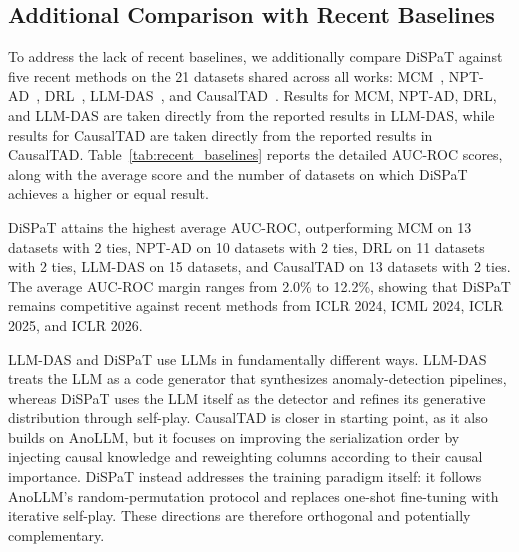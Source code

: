 \subsection{Additional Comparison with Recent Baselines}
\label{sec:app:recent_baselines}

To address the lack of recent baselines, we additionally compare DiSPaT against five recent methods on the 21 datasets shared across all works: MCM~\citep{yin2024mcm}, NPT-AD~\citep{thimonier2024nptad}, DRL~\citep{ye2025drl}, LLM-DAS~\citep{ye2026llmdas}, and CausalTAD~\citep{wang2026causaltad}. Results for MCM, NPT-AD, DRL, and LLM-DAS are taken directly from the reported results in LLM-DAS, while results for CausalTAD are taken directly from the reported results in CausalTAD. Table~\ref{tab:recent_baselines} reports the detailed AUC-ROC scores, along with the average score and the number of datasets on which DiSPaT achieves a higher or equal result.

DiSPaT attains the highest average AUC-ROC, outperforming MCM on 13 datasets with 2 ties, NPT-AD on 10 datasets with 2 ties, DRL on 11 datasets with 2 ties, LLM-DAS on 15 datasets, and CausalTAD on 13 datasets with 2 ties. The average AUC-ROC margin ranges from 2.0\% to 12.2\%, showing that DiSPaT remains competitive against recent methods from ICLR 2024, ICML 2024, ICLR 2025, and ICLR 2026.

LLM-DAS and DiSPaT use LLMs in fundamentally different ways. LLM-DAS treats the LLM as a code generator that synthesizes anomaly-detection pipelines, whereas DiSPaT uses the LLM itself as the detector and refines its generative distribution through self-play. CausalTAD is closer in starting point, as it also builds on AnoLLM, but it focuses on improving the serialization order by injecting causal knowledge and reweighting columns according to their causal importance. DiSPaT instead addresses the training paradigm itself: it follows AnoLLM's random-permutation protocol and replaces one-shot fine-tuning with iterative self-play. These directions are therefore orthogonal and potentially complementary.

